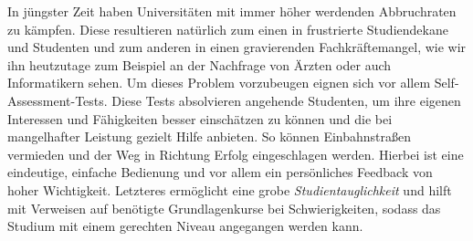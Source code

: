\label{Einleitung-und-Motivation}
In jüngster Zeit haben Universitäten mit immer höher werdenden Abbruchraten zu kämpfen. Diese resultieren natürlich zum einen in frustrierte Studiendekane und Studenten und zum anderen in einen gravierenden Fachkräftemangel, wie wir ihn heutzutage zum Beispiel an der Nachfrage von Ärzten oder auch Informatikern sehen. Um dieses Problem vorzubeugen eignen sich vor allem Self-Assessment-Tests. Diese Tests absolvieren angehende Studenten, um ihre eigenen Interessen und Fähigkeiten besser einschätzen zu können und die bei mangelhafter Leistung gezielt Hilfe anbieten. So können Einbahnstraßen vermieden und der Weg in Richtung Erfolg eingeschlagen werden. Hierbei ist eine eindeutige, einfache Bedienung und vor allem ein persönliches Feedback von hoher Wichtigkeit. Letzteres ermöglicht eine grobe \textit{Studientauglichkeit} und hilft mit Verweisen auf benötigte Grundlagenkurse bei Schwierigkeiten, sodass das Studium mit einem gerechten Niveau angegangen werden kann.